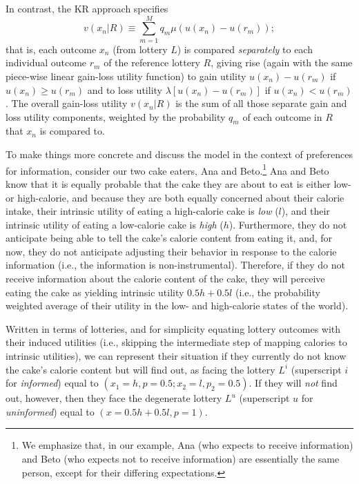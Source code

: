 \documentclass[12pt]{article}
\begin{document}
In contrast, the KR approach specifies
\begin{equation*}
  v(x_n|R) \equiv \sum_{m=1}^M q_m \mu (u(x_n)-u(r_m));
\end{equation*}
that is, each outcome $x_n$ (from lottery $L$) is compared \emph{separately} to each individual outcome $r_m$ of the reference lottery $R$, giving rise (again with the same piece-wise linear gain-loss utility function) to gain utility $u(x_n)-u(r_m)$ if $u(x_n) \geq u(r_m)$ and to loss utility $\lambda [u(x_n)-u(r_m)]$ if $u(x_n)<u(r_m)$. The overall gain-loss utility $v(x_n|R)$ is the sum of all those separate gain and loss utility components, weighted by the probability $q_m$ of each outcome in $R$ that $x_n$ is compared to.

To make things more concrete and discuss the model in the context of preferences for information, consider our two cake eaters, Ana and Beto.\footnote{We emphasize that, in our example, Ana (who expects to receive information) and Beto (who expects not to receive information) are essentially the same person, except for their differing expectations.} Ana and Beto know that it is equally probable that the cake they are about to eat is either low- or high-calorie, and because they are both equally concerned about their calorie intake, their intrinsic utility of eating a high-calorie cake is \emph{low} ($l$), and their intrinsic utility of eating a low-calorie cake is \emph{high} ($h$). Furthermore, they do not anticipate being able to tell the cake’s calorie content from eating it, and, for now, they do not anticipate adjusting their behavior in response to the calorie information (i.e., the information is non-instrumental). Therefore, if they do not receive information about the calorie content of the cake, they will perceive eating the cake as yielding intrinsic utility $0.5h+0.5l$ (i.e., the probability weighted average of their utility in the low- and high-calorie states of the world).

Written in terms of lotteries, and for simplicity equating lottery outcomes with their induced utilities (i.e., skipping the intermediate step of mapping calories to intrinsic utilities), we can represent their situation if they currently do not know the cake's calorie content but will find out, as facing the lottery $L^i$ (superscript $i$ for \emph{informed}) equal to $(x_1=h,p=0.5;x_2=l,p_2=0.5)$. If they will \emph{not} find out, however, then they face the degenerate lottery $L^u$ (superscript $u$ for \emph{uninformed}) equal to $(x=0.5h+0.5l,p=1)$.
\end{document}

